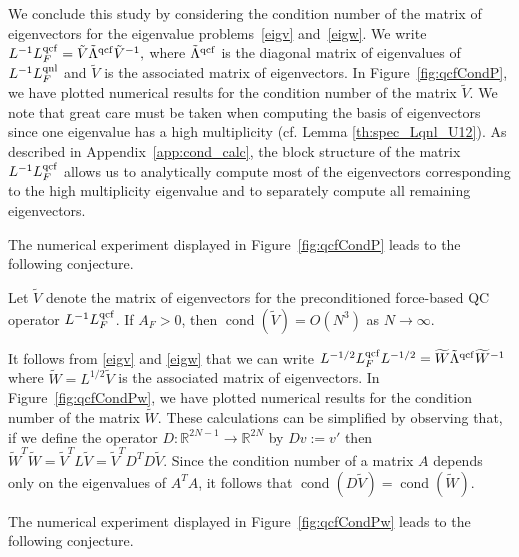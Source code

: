 \documentclass[12pt,reqno]{amsart}
\newcounter{theorem}
\newenvironment{conjecture}[1][!]{{\refstepcounter{theorem}\bigskip

{\noindent\bf{Conjecture}~\thetheorem\if{#1}!{. }\else{ ({#1}).}\fi}
\it}}{}
\begin{document}
We conclude this study by considering the condition number of the
matrix of eigenvectors for the eigenvalue problems~\eqref{eigv}
and~\eqref{eigw}.  We write ${{L}}^{-1}{L^{{\rm qcf}}_F} = {{ \tilde V}} \tilde
\Lambda^{{\rm qcf}} {{ \tilde V}}^{-1},$ where $\tilde \Lambda^{{\rm qcf}}$
is the diagonal matrix of eigenvalues of ${{L}}^{-1}{L^{{\rm qnl}}_F}$ and ${{ \tilde V}}$
is the associated matrix of eigenvectors.  In
Figure~\ref{fig:qcfCondP}, we have plotted numerical results for the
condition number of the matrix ${{ \tilde V}}.$
We note that great care must
be taken when computing the basis of eigenvectors since one eigenvalue
has a high multiplicity (cf. Lemma \ref{th:spec_Lqnl_U12}).  As
described in Appendix~\ref{app:cond_calc}, the block structure of the
matrix ${{L}}^{-1}{L^{{\rm qcf}}_F}$ allows us to analytically compute most of the
eigenvectors corresponding to the high multiplicity eigenvalue and to
separately compute all remaining eigenvectors.

The numerical experiment displayed in Figure~\ref{fig:qcfCondP} leads
to the following conjecture.

\begin{conjecture}
  \label{th:qcf:condP_U02}
  Let ${{ \tilde V}}$ denote the matrix of eigenvectors for the preconditioned
  force-based QC operator ${{L}}^{-1} {L^{{\rm qcf}}_F}$.  If $A_F > 0$, then
  $\operatorname{cond}({{ \tilde V}}) = O\left(N^{3} \right)$ as $N \to \infty$.
\end{conjecture}

\medskip It follows from \eqref{eigv} and \eqref{eigw} that we can
write ${{L}}^{-1/2} {L^{{\rm qcf}}_F} {{L}}^{-1/2} = {{ \widetilde W}} \tilde \Lambda^{{\rm
    qcf}} {{ \widetilde W}}^{-1}$ where ${{ \widetilde W}}={{L}}^{1/2}{{ \tilde V}}$ is the associated
matrix of eigenvectors.  In Figure~\ref{fig:qcfCondPw}, we have
plotted numerical results for the condition number of the matrix
${{ \widetilde W}}.$ These calculations can be simplified by observing that, if we
define the operator $D: {\mathbb{R}}^{2N-1} \rightarrow {\mathbb{R}}^{2N}$ by $D v := v'$
then ${{ \widetilde W}}^T {{ \widetilde W}} = {{ \tilde V}}^T L {{ \tilde V}} = {{ \tilde V}}^T D^T D {{ \tilde V}}.$ Since
the condition number of a matrix $A$ depends only on the eigenvalues
of $A^T A$, it follows that $\operatorname{cond}(D{{ \tilde V}})=\operatorname{cond}({{ \widetilde W}})$.

The numerical experiment displayed in Figure~\ref{fig:qcfCondPw} leads
to the following conjecture.
\end{document}
